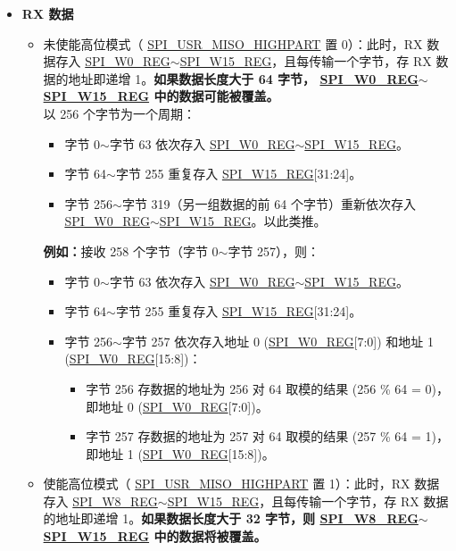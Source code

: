 \documentclass[main\_\_CN.tex]{subfiles}
\begin{document}
\begin{itemize}
    \item \textbf{RX 数据}
    \begin{itemize}
        \item 未使能高位模式（ \hyperref[fielddesc:SPIUSRMISOHIGHPART]{SPI\_USR\_MISO\_HIGHPART} 置 0）：此时，RX 数据存入 \hyperref[regdesc:SPIW0REG]{SPI\_W0\_REG}$\sim$\hyperref[regdesc:SPIW15REG]{SPI\_W15\_REG}，且每传输一个字节，存 RX 数据的地址即递增 1。\textbf{如果数据长度大于 64 字节， \hyperref[regdesc:SPIW0REG]{SPI\_W0\_REG}$\sim$\hyperref[regdesc:SPIW15REG]{SPI\_W15\_REG} 中的数据可能被覆盖。}\\
        以 256 个字节为一个周期：
        \begin{itemize}
            \item 字节 0$\sim$字节 63 依次存入 \hyperref[regdesc:SPIW0REG]{SPI\_W0\_REG}$\sim$\hyperref[regdesc:SPIW0REG]{SPI\_W15\_REG}。
            \item 字节 64$\sim$字节 255 重复存入 \hyperref[regdesc:SPIW0REG]{SPI\_W15\_REG}[31:24]。
            \item 字节 256$\sim$字节 319（另一组数据的前 64 个字节）重新依次存入 \hyperref[regdesc:SPIW0REG]{SPI\_W0\_REG}$\sim$\hyperref[regdesc:SPIW0REG]{SPI\_W15\_REG}。以此类推。
        \end{itemize}
        \textbf{例如：}接收 258 个字节（字节 0$\sim$字节 257），则：
        \begin{itemize}
            \item 字节 0$\sim$字节 63 依次存入 \hyperref[regdesc:SPIW0REG]{SPI\_W0\_REG}$\sim$\hyperref[regdesc:SPIW0REG]{SPI\_W15\_REG}。
            \item 字节 64$\sim$字节 255 重复存入 \hyperref[regdesc:SPIW0REG]{SPI\_W15\_REG}[31:24]。
            \item 字节 256$\sim$字节 257 依次存入地址 0 (\hyperref[regdesc:SPIW0REG]{SPI\_W0\_REG}[7:0]) 和地址 1 (\hyperref[regdesc:SPIW0REG]{SPI\_W0\_REG}[15:8])：
            \begin{itemize}
                \item 字节 256 存数据的地址为 256 对 64 取模的结果 (256 \% 64 = 0)，即地址 0 (\hyperref[regdesc:SPIW0REG]{SPI\_W0\_REG}[7:0])。
                \item 字节 257 存数据的地址为 257 对 64 取模的结果 (257 \% 64 = 1)，即地址 1 (\hyperref[regdesc:SPIW0REG]{SPI\_W0\_REG}[15:8])。
            \end{itemize}
        \end{itemize}
        \item 使能高位模式（ \hyperref[fielddesc:SPIUSRMISOHIGHPART]{SPI\_USR\_MISO\_HIGHPART} 置 1）：此时，RX 数据存入 \hyperref[regdesc:SPIW8REG]{SPI\_W8\_REG}$\sim$\hyperref[regdesc:SPIW15REG]{SPI\_W15\_REG}，且每传输一个字节，存 RX 数据的地址即递增 1。\textbf{如果数据长度大于 32 字节，则 \hyperref[regdesc:SPIW8REG]{SPI\_W8\_REG}$\sim$\hyperref[regdesc:SPIW15REG]{SPI\_W15\_REG} 中的数据将被覆盖。}\\

\end{itemize}
\end{itemize}
\end{document}
